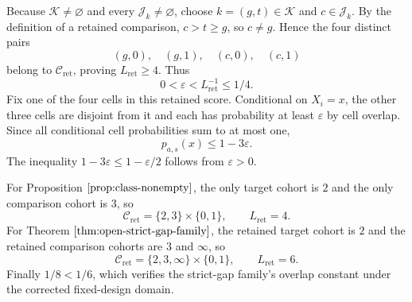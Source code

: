 Because \(\mathcal K\ne\varnothing\) and every \(\mathcal J_k\ne\varnothing\), choose \(k=(g,t)\in\mathcal K\) and \(c\in\mathcal J_k\). By the definition of a retained comparison, \(c>t\ge g\), so \(c\ne g\). Hence the four distinct pairs
\[
(g,0),\quad(g,1),\quad(c,0),\quad(c,1)
\]
belong to \(\mathcal C_{\mathrm{ret}}\), proving \(L_{\mathrm{ret}}\ge4\). Thus
\[
0<\varepsilon<L_{\mathrm{ret}}^{-1}\le1/4.
\]
Fix one of the four cells in this retained score. Conditional on \(X_i=x\), the other three cells are disjoint from it and each has probability at least \(\varepsilon\) by cell overlap. Since all conditional cell probabilities sum to at most one,
\[
p_{a,s}(x)\le1-3\varepsilon.
\]
The inequality \(1-3\varepsilon\le1-\varepsilon/2\) follows from \(\varepsilon>0\).

For Proposition \(\ref{prop:class-nonempty}\), the only target cohort is \(2\) and the only comparison cohort is \(3\), so
\[
\mathcal C_{\mathrm{ret}}=\{2,3\}\times\{0,1\},
\qquad L_{\mathrm{ret}}=4.
\]
For Theorem \(\ref{thm:open-strict-gap-family}\), the retained target cohort is \(2\) and the retained comparison cohorts are \(3\) and \(\infty\), so
\[
\mathcal C_{\mathrm{ret}}=\{2,3,\infty\}\times\{0,1\},
\qquad L_{\mathrm{ret}}=6.
\]
Finally \(1/8<1/6\), which verifies the strict-gap family's overlap constant under the corrected fixed-design domain.